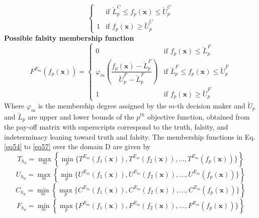 \documentclass[a4paper]{elsarticle}
\begin{document}
{\begin{equation}
\begin{cases}
& \text{if } \breve{L}^{C}_{p} \le f_p(\mathbf{x}) \le \breve{U}^{C}_{p}\\[10pt]
1 & \text{if } f_p(\mathbf{x}) \ge \breve{U}^{C}_{p}
\end{cases}
\end{equation}
\noindent\textbf{Possible falsity membership function}
\begin{equation}
\label{eq53}
F^{E_m}(f_p(\mathbf{x})) =
\begin{cases}
0 & \text{if } f_p(\mathbf{x}) \le \breve{L}^{F}_{p}\\[6pt]
\varphi_m\left(\dfrac{f_p(\mathbf{x})-\breve{L}^{F}_{p}}{\breve{U}^{F}_{p}-\breve{L}^{F}_{p}}\right)
& \text{if } \breve{L}^{F}_{p} \le f_p(\mathbf{x}) \le \breve{U}^{F}_{p}\\[10pt]
1 & \text{if } f_p(\mathbf{x}) \ge \breve{U}^{F}_{p}
\end{cases}
\end{equation}
Where $\varphi_m$ is the membership degree assigned by the $m$-th decision maker and ${\breve{U}_p}$ and ${\breve{L}_p}$ are upper and lower bounds of the $p^{th}$ objective function, obtained from the pay-off matrix with superscripts correspond to the truth, falsity, and indeterminacy leaning toward truth and falsity.
The membership functions in Eq. \ref{eq54} to \ref{eq57} over the domain D are given by
\begin{equation}
\label{eq54}
T_{h_{d}} = \max_{m} \left\{ \min_{p} \{ T^{E_m}(f_1(\mathbf{x})), T^{E_m}(f_2(\mathbf{x})), \ldots, T^{E_m}(f_p(\mathbf{x})) \} \right\}
\end{equation}
\begin{equation}
U_{h_{d}} = \max_{m} \left\{ \min_{p} \{ U^{E_m}(f_1(\mathbf{x})), U^{E_m}(f_2(\mathbf{x})), \ldots, U^{E_m}(f_p(\mathbf{x})) \} \right\}
\end{equation}
\begin{equation}
C_{h_{d}} = \min_{m} \left\{ \max_{p} \{ C^{E_m}(f_1(\mathbf{x})), C^{E_m}(f_2(\mathbf{x})), \ldots, C^{E_m}(f_p(\mathbf{x})) \} \right\}
\end{equation}
\begin{equation}
\label{eq57}
F_{h_{d}} = \min_{m} \left\{ \max_{p} \{ F^{E_m}(f_1(\mathbf{x})), F^{E_m}(f_2(\mathbf{x})), \ldots, F^{E_m}(f_p(\mathbf{x})) \} \right\}

\end{equation}}
\end{document}
